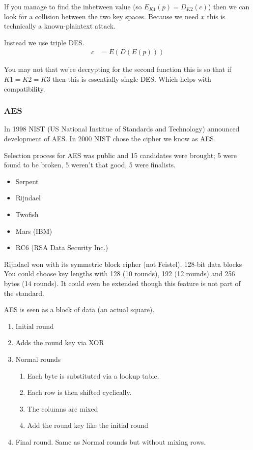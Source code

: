 \documentclass{report}
\begin{document}
If you manage to find the inbetween value (so $E_{K1}(p) = D_{K2}(c)$) then we
can look for a collision between the two key spaces.
Because we need $x$ this is technically a known-plaintext attack.

Instead we use triple DES\@.
\begin{align*}
    c &= E(D(E(p)))
\end{align*}

You may not that we're decrypting for the second function this is so that if
$K1=K2=K3$ then this is essentially single DES\@. Which helps with compatibility.

\subsubsection{AES}
In 1998 NIST (US National Institue of Standards and Technology) announced
development of AES\@. In 2000 NIST chose the cipher we know as AES\@.

Selection process for AES was public and 15 candidates were brought;
5 were found to be broken,
5 weren't that good,
5 were finalists.
\begin{itemize}
    \item Serpent
    \item Rijndael
    \item Twofish
    \item Mars (IBM)
    \item RC6 (RSA Data Security Inc.)
\end{itemize}

Rijndael won with its symmetric block cipher (not Feistel).
128-bit data blocks
You could choose key lengths with 128 (10 rounds), 192 (12 rounds)
and 256 bytes (14 rounds). It could even be
extended though this feature is not part of the standard.

AES is seen as a block of data (an actual square).
\begin{enumerate}
    \item Initial round
    \item Adds the round key via XOR
    \item Normal rounds
        \begin{enumerate}
            \item Each byte is substituted via a lookup table.
            \item Each row is then shifted cyclically.
            \item The columns are mixed
            \item Add the round key like the initial round
        \end{enumerate}
    \item Final round. Same as Normal rounds but without mixing rows.
\end{enumerate}
\end{document}

